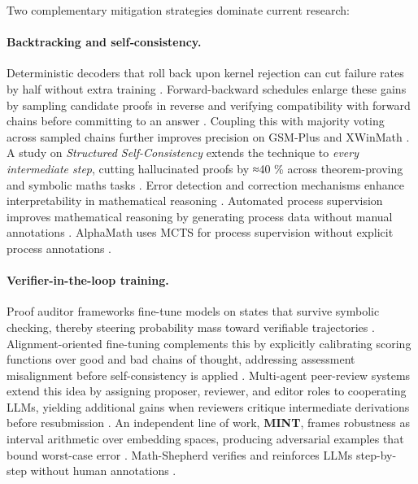 \documentclass[acmsmall,anonymous]{acmart}
\begin{document}
Two complementary mitigation strategies dominate current research:

\paragraph{Backtracking and self‐consistency.}
Deterministic decoders that roll back upon kernel rejection can cut failure rates by half without extra training \cite{lee2024backtracking}.  Forward-backward schedules enlarge these gains by sampling candidate proofs in reverse and verifying compatibility with forward chains before committing to an answer \cite{jiang-2024-forward-backward}.  Coupling this with majority voting across sampled chains further improves precision on GSM‐Plus and XWinMath \cite{li2024mugglemath}. A study on \emph{Structured Self-Consistency} extends the
  technique to \emph{every intermediate step}, cutting
  hallucinated proofs by ≈40 \% across theorem-proving and symbolic
  maths tasks \cite{Liu2025SC}. Error detection and correction mechanisms enhance interpretability in mathematical reasoning \cite{leiva2025errordetection,anonymous2025errordetection}. Automated process supervision improves mathematical reasoning by generating process data without manual annotations \cite{luo2024improve}. AlphaMath uses MCTS for process supervision without explicit process annotations \cite{wang2024 d alpha}.

\paragraph{Verifier-in-the-loop training.}
Proof auditor frameworks fine-tune models on states that survive symbolic checking, thereby steering probability mass toward verifiable trajectories \cite{wang2024mumath}.  Alignment-oriented fine-tuning complements this by explicitly calibrating scoring functions over good and bad chains of thought, addressing assessment misalignment before self-consistency is applied \cite{wang-2023-alignment-reasoning}.  Multi-agent peer-review systems extend this idea by assigning proposer, reviewer, and editor roles to cooperating LLMs, yielding additional gains when reviewers critique intermediate derivations before resubmission \cite{xu-2023-peer-review}.  An independent line of work, \textbf{MINT}, frames robustness as interval arithmetic over embedding spaces, producing adversarial examples that bound worst-case error \cite{li2024mint}. Math-Shepherd verifies and reinforces LLMs step-by-step without human annotations \cite{wang2024c}.
\end{document}
